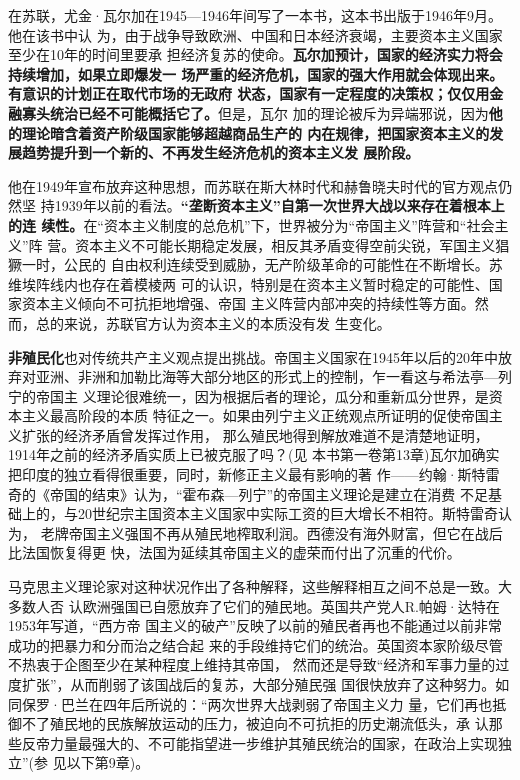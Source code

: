在苏联，尤金·瓦尔加在1945—1946年间写了一本书，这本书出版于1946年9月。他在该书中认
为，由于战争导致欧洲、中国和日本经济衰竭，主要资本主义国家至少在10年的时间里要承
担经济复苏的使命。\textbf{瓦尔加预计，国家的经济实力将会持续增加，如果立即爆发一
  场严重的经济危机，国家的强大作用就会体现出来。有意识的计划正在取代市场的无政府
  状态，国家有一定程度的决策权；仅仅用金融寡头统治已经不可能概括它了。}但是，瓦尔
加的理论被斥为异端邪说，因为\textbf{他的理论暗含着资产阶级国家能够超越商品生产的
  内在规律，把国家资本主义的发展趋势提升到一个新的、不再发生经济危机的资本主义发
  展阶段。}

他在1949年宣布放弃这种思想，而苏联在斯大林时代和赫鲁晓夫时代的官方观点仍然坚
持1939年以前的看法。\textbf{“垄断资本主义”自第一次世界大战以来存在着根本上的连
  续性。}在“资本主义制度的总危机”下，世界被分为“帝国主义”阵营和“社会主义”阵
营。资本主义不可能长期稳定发展，相反其矛盾变得空前尖锐，军国主义猖獗一时，公民的
自由权利连续受到威胁，无产阶级革命的可能性在不断增长。苏维埃阵线内也存在着模棱两
可的认识，特别是在资本主义暂时稳定的可能性、国家资本主义倾向不可抗拒地增强、帝国
主义阵营内部冲突的持续性等方面。然而，总的来说，苏联官方认为资本主义的本质没有发
生变化。

\textbf{非殖民化}也对传统共产主义观点提出挑战。帝国主义国家在1945年以后的20年中放
弃对亚洲、非洲和加勒比海等大部分地区的形式上的控制，乍一看这与希法亭—列宁的帝国主
义理论很难统一，因为根据后者的理论，瓜分和重新瓜分世界，是资本主义最高阶段的本质
特征之一。如果由列宁主义正统观点所证明的促使帝国主义扩张的经济矛盾曾发挥过作用，
那么殖民地得到解放难道不是清楚地证明，1914年之前的经济矛盾实质上已被克服了吗？(见
本书第一卷第13章)瓦尔加确实把印度的独立看得很重要，同时，新修正主义最有影响的著
作——约翰·斯特雷奇的《帝国的结束》认为，“霍布森—列宁”的帝国主义理论是建立在消费
不足基础上的，与20世纪宗主国资本主义国家中实际工资的巨大增长不相符。斯特雷奇认为，
老牌帝国主义强国不再从殖民地榨取利润。西德没有海外财富，但它在战后比法国恢复得更
快，法国为延续其帝国主义的虚荣而付出了沉重的代价。

马克思主义理论家对这种状况作出了各种解释，这些解释相互之间不总是一致。大多数人否
认欧洲强国已自愿放弃了它们的殖民地。英国共产党人R.帕姆·达特在1953年写道，“西方帝
国主义的破产”反映了以前的殖民者再也不能通过以前非常成功的把暴力和分而治之结合起
来的手段维持它们的统治。英国资本家阶级尽管不热衷于企图至少在某种程度上维持其帝国，
然而还是导致“经济和军事力量的过度扩张”，从而削弱了该国战后的复苏，大部分殖民强
国很快放弃了这种努力。如同保罗·巴兰在四年后所说的：“两次世界大战剥弱了帝国主义力
量，它们再也抵御不了殖民地的民族解放运动的压力，被迫向不可抗拒的历史潮流低头，承
认那些反帝力量最强大的、不可能指望进一步维护其殖民统治的国家，在政治上实现独立”(参
见以下第9章)。

